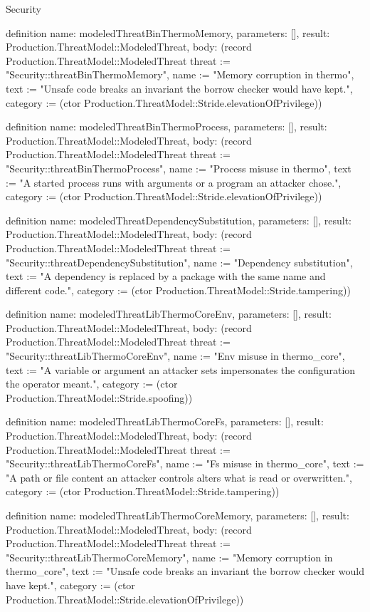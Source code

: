 \begin{lexlean}{Security}
\begin{semanticmodule}
definition{
  name: modeledThreatBinThermoMemory,
  parameters: [],
  result: Production.ThreatModel::ModeledThreat,
  body: (record Production.ThreatModel::ModeledThreat {threat := "Security::threatBinThermoMemory", name := "Memory corruption in thermo", text := "Unsafe code breaks an invariant the borrow checker would have kept.", category := (ctor Production.ThreatModel::Stride.elevationOfPrivilege)})
}

definition{
  name: modeledThreatBinThermoProcess,
  parameters: [],
  result: Production.ThreatModel::ModeledThreat,
  body: (record Production.ThreatModel::ModeledThreat {threat := "Security::threatBinThermoProcess", name := "Process misuse in thermo", text := "A started process runs with arguments or a program an attacker chose.", category := (ctor Production.ThreatModel::Stride.elevationOfPrivilege)})
}

definition{
  name: modeledThreatDependencySubstitution,
  parameters: [],
  result: Production.ThreatModel::ModeledThreat,
  body: (record Production.ThreatModel::ModeledThreat {threat := "Security::threatDependencySubstitution", name := "Dependency substitution", text := "A dependency is replaced by a package with the same name and different code.", category := (ctor Production.ThreatModel::Stride.tampering)})
}

definition{
  name: modeledThreatLibThermoCoreEnv,
  parameters: [],
  result: Production.ThreatModel::ModeledThreat,
  body: (record Production.ThreatModel::ModeledThreat {threat := "Security::threatLibThermoCoreEnv", name := "Env misuse in thermo_core", text := "A variable or argument an attacker sets impersonates the configuration the operator meant.", category := (ctor Production.ThreatModel::Stride.spoofing)})
}

definition{
  name: modeledThreatLibThermoCoreFs,
  parameters: [],
  result: Production.ThreatModel::ModeledThreat,
  body: (record Production.ThreatModel::ModeledThreat {threat := "Security::threatLibThermoCoreFs", name := "Fs misuse in thermo_core", text := "A path or file content an attacker controls alters what is read or overwritten.", category := (ctor Production.ThreatModel::Stride.tampering)})
}

definition{
  name: modeledThreatLibThermoCoreMemory,
  parameters: [],
  result: Production.ThreatModel::ModeledThreat,
  body: (record Production.ThreatModel::ModeledThreat {threat := "Security::threatLibThermoCoreMemory", name := "Memory corruption in thermo_core", text := "Unsafe code breaks an invariant the borrow checker would have kept.", category := (ctor Production.ThreatModel::Stride.elevationOfPrivilege)})
}


\end{semanticmodule}
\end{lexlean}
